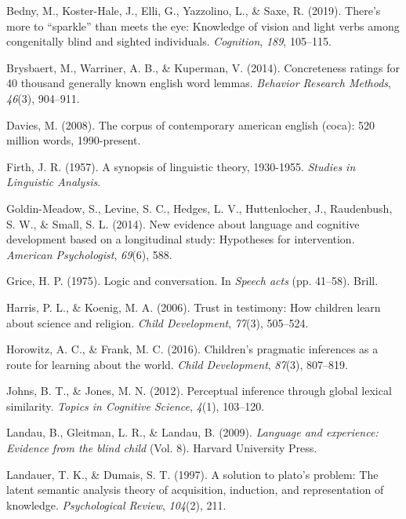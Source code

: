 \documentclass[10pt, letterpaper]{article}
\begin{document}
\leavevmode\hypertarget{ref-bedny2019}{}%
Bedny, M., Koster-Hale, J., Elli, G., Yazzolino, L., \& Saxe, R. (2019).
There's more to ``sparkle'' than meets the eye: Knowledge of vision and
light verbs among congenitally blind and sighted individuals.
\emph{Cognition}, \emph{189}, 105--115.

\leavevmode\hypertarget{ref-brysbaert2014}{}%
Brysbaert, M., Warriner, A. B., \& Kuperman, V. (2014). Concreteness
ratings for 40 thousand generally known english word lemmas.
\emph{Behavior Research Methods}, \emph{46}(3), 904--911.

\leavevmode\hypertarget{ref-davies2008}{}%
Davies, M. (2008). The corpus of contemporary american english (coca):
520 million words, 1990-present.

\leavevmode\hypertarget{ref-firth1957}{}%
Firth, J. R. (1957). A synopsis of linguistic theory, 1930-1955.
\emph{Studies in Linguistic Analysis}.

\leavevmode\hypertarget{ref-goldin-meadow2014}{}%
Goldin-Meadow, S., Levine, S. C., Hedges, L. V., Huttenlocher, J.,
Raudenbush, S. W., \& Small, S. L. (2014). New evidence about language
and cognitive development based on a longitudinal study: Hypotheses for
intervention. \emph{American Psychologist}, \emph{69}(6), 588.

\leavevmode\hypertarget{ref-grice1975}{}%
Grice, H. P. (1975). Logic and conversation. In \emph{Speech acts} (pp.
41--58). Brill.

\leavevmode\hypertarget{ref-harris2006}{}%
Harris, P. L., \& Koenig, M. A. (2006). Trust in testimony: How children
learn about science and religion. \emph{Child Development},
\emph{77}(3), 505--524.

\leavevmode\hypertarget{ref-horowitz2016}{}%
Horowitz, A. C., \& Frank, M. C. (2016). Children's pragmatic inferences
as a route for learning about the world. \emph{Child Development},
\emph{87}(3), 807--819.

\leavevmode\hypertarget{ref-johns2012}{}%
Johns, B. T., \& Jones, M. N. (2012). Perceptual inference through
global lexical similarity. \emph{Topics in Cognitive Science},
\emph{4}(1), 103--120.

\leavevmode\hypertarget{ref-landau2009}{}%
Landau, B., Gleitman, L. R., \& Landau, B. (2009). \emph{Language and
experience: Evidence from the blind child} (Vol. 8). Harvard University
Press.

\leavevmode\hypertarget{ref-landauer1997}{}%
Landauer, T. K., \& Dumais, S. T. (1997). A solution to plato's problem:
The latent semantic analysis theory of acquisition, induction, and
representation of knowledge. \emph{Psychological Review}, \emph{104}(2),
211.
\end{document}
